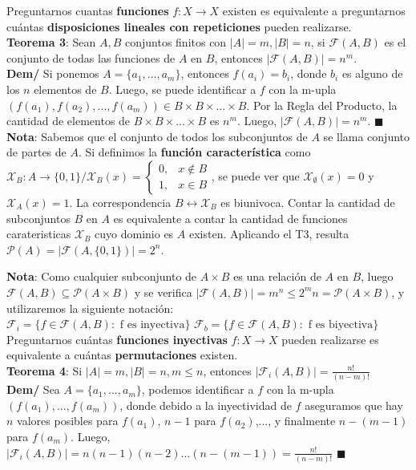 \documentclass[11pt,a4paper]{article}
\newcommand*{\QEDA}{\null\nobreak\hfill\ensuremath{\blacksquare}}
\begin{document}
\newpage

Preguntarnos cuantas \textbf{funciones} $f: X \rightarrow X$ existen es equivalente a preguntarnos cuántas \textbf{disposiciones lineales con repeticiones} pueden realizarse.\\
\textbf{Teorema 3}: Sean $A,B$ conjuntos finitos con $|A|=m, |B|=n$, si $\mathcal{F}(A,B)$ es el conjunto de todas las funciones de $A$ en $B$, entonces $|\mathcal{F}(A,B)| = n^m$.\\
\textbf{Dem/} Si ponemos $A = \{a_1,...,a_m\}$, entonces $f(a_i) = b_i$, donde $b_i$ es alguno de los $n$ elementos de $B$. Luego, se puede identificar a $f$ con la m-upla $(f(a_1),f(a_2),...,f(a_m)) \in B \times B \times ... \times B$. Por la Regla del Producto, la cantidad de elementos de $B \times B \times ... \times B$ es $n^m$. Luego, $|\mathcal{F}(A,B)| = n^m$. \QEDA\\

{
\renewcommand{\arraystretch}{.5}
\textbf{Nota}: Sabemos que el conjunto de todos los subconjuntos de $A$ se llama conjunto de partes de $A$. Si definimos la \textbf{funci\'on caracter\'istica} como $\mathcal{X}_B : A \rightarrow\{0,1\} / \mathcal{X}_B(x) = \left\{\begin{array}{ll} 0, & x \not \in B \\ 1, & x \in B\end{array}\right.$, se puede ver que $\mathcal{X}_\emptyset(x) = 0$ y $\mathcal{X}_A(x) = 1$. La correspondencia $B \leftrightarrow \mathcal{X}_B$ es biunivoca. Contar la cantidad de subconjuntos $B$ en $A$ es equivalente a contar la cantidad de funciones carateristicas $\mathcal{X}_B$ cuyo dominio es $A$ existen. Aplicando el T3, resulta $\mathcal{P}(A) = |\mathcal{F}(A,\{0,1\})| = 2^n$.\\
}

\textbf{Nota}: Como cualquier subconjunto de $A \times B$ es una relaci\'on de $A$ en $B$, luego $\mathcal{F}(A, B) \subseteq \mathcal{P}(A \times B)$ y se verifica $|\mathcal{F}(A,B)| = m^n \leq 2^mn = \mathcal{P}(A \times B)$, y utilizaremos la siguiente notaci\'on:\\
$\mathcal{F}_i = \{f \in \mathcal{F}(A,B) : \text{ f es inyectiva}\}$ \hfill $\mathcal{F}_b = \{f \in \mathcal{F}(A,B) : \text{ f es biyectiva}\}$\\


Preguntarnos cuántas \textbf{funciones inyectivas} $f : X \rightarrow X$ pueden realizarse es equivalente a cuántas \textbf{permutaciones} existen.\\
\textbf{Teorema 4}: Si $|A| = m, |B| = n, m \leq n$, entonces $|\mathcal{F}_i(A,B)| = \frac{n!}{(n-m)!}$\\
\textbf{Dem/} Sea $A=\{a_1,...,a_m\}$, podemos identificar a $f$ con la m-upla $(f(a_1),...,f(a_m))$, donde debido a la inyectividad de $f$ aseguramos que hay $n$ valores posibles para $f(a_1)$, $n-1$ para $f(a_2)$,..., y finalmente $n-(m-1)$ para $f(a_m)$. Luego, $|\mathcal{F}_i(A,B)| = n (n-1) (n-2)...(n-(m-1)) = \frac{n!}{(n-m)!}$ \QEDA\\
\end{document}
